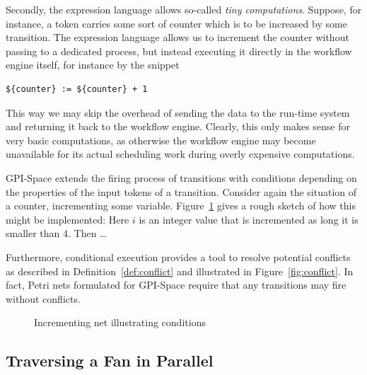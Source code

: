 \documentclass[
  paper=a4,
  titlepage,
  bibliography=totoc,
  listof=totoc,
  pagesize=pdftex
]{scrartcl}
\numberwithin{figure}{section}
\numberwithin{equation}{section}
\numberwithin{table}{section}
\theoremstyle{definition}
\numberwithin{definition}{section}
\begin{document}
\begin{description}[leftmargin=\parindent]
    Secondly, the expression language allows so-called \emph{tiny computations}. Suppose,
    for instance, a token carries some sort of counter which is to be increased by some
    transition. The expression language allows us to increment the counter without passing
    to a dedicated process, but instead executing it directly in the workflow engine
    itself, for instance by the snippet
    \begin{verbatim}${counter} := ${counter} + 1\end{verbatim}
    This way we may skip the overhead of sending the data to the run-time system and
    returning it back to the workflow engine. Clearly, this only makes sense for very
    basic computations, as otherwise the workflow engine may become unavailable for its
    actual scheduling work during overly expensive computations.
  \item[Conditions:] GPI-Space extends the firing process of transitions with conditions
    depending on the properties of the input tokens of a transition. Consider again the
    situation of a counter, incrementing some variable. Figure~\ref{fig:inc} gives a rough
    sketch of how this might be implemented: Here $i$ is an integer value that is
    incremented as long it is smaller than 4. Then \dots

    Furthermore, conditional execution provides a tool to resolve potential conflicts as
    described in Definition~\ref{def:conflict} and illustrated in Figure~\ref{fig:conflict}.
    In fact, Petri nets formulated for GPI-Space require that any transitions may fire
    without conflicts.
\end{description}

\begin{figure}[htbp]
  \centering
  \caption{Incrementing net illustrating conditions}
  \label{fig:inc}
\end{figure}


\subsection{Traversing a Fan in Parallel}
\label{sec:traverseParal}
\end{document}
